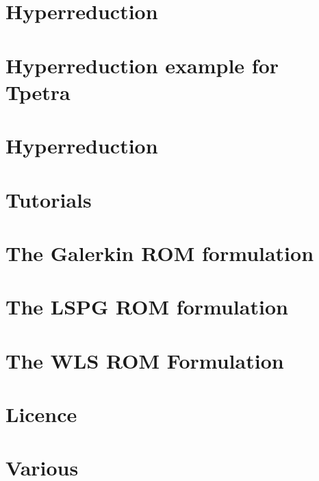\let\mypdfximage\pdfximage\def\pdfximage{\immediate\mypdfximage}\documentclass[twoside]{book}
\newcommand{\+}{\discretionary{\mbox{\scriptsize$\hookleftarrow$}}{}{}}
\newcommand{\clearemptydoublepage}{%
  \newpage{\pagestyle{empty}\cleardoublepage}%
}
\begin{document}
\chapter{Hyperreduction}
\label{md_pages_hyperreduction_hyperred_how_to_enable}

\chapter{Hyperreduction example for Tpetra}
\label{md_pages_hyperreduction_hyperred_tpetra_example}

\chapter{Hyperreduction}
\label{md_pages_hyperreduction}

\chapter{Tutorials}
\label{md_pages_tutorials}

\chapter{The Galerkin ROM formulation}
\label{md_pages_various_formulation_galerkin}

\chapter{The LSPG ROM formulation}
\label{md_pages_various_formulation_lspg}

\chapter{The WLS ROM Formulation}
\label{md_pages_various_formulation_wls}

\chapter{Licence}
\label{md_pages_various_license}

\chapter{Various}
\label{md_pages_various}


\backmatter
\newpage
{}
\clearemptydoublepage
{}
\printindex
\end{document}
